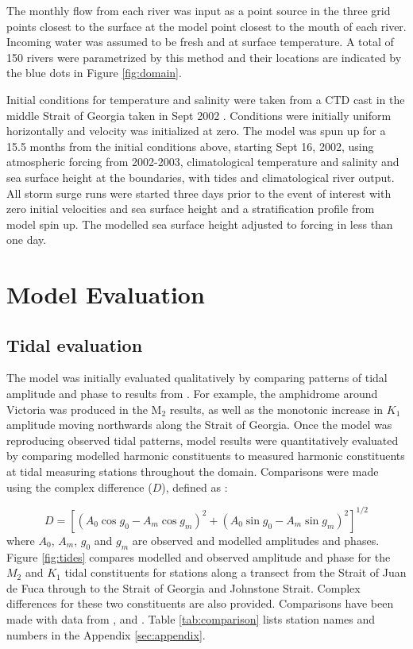 \documentclass[pdftex,10pt]{article}
\begin{document}
The monthly flow from each river was input as a point source in the three grid points closest to the surface at the model point closest to the mouth of each river. Incoming water was assumed to be fresh and at surface temperature. A total of 150 rivers were parametrized by this method and their locations are indicated by the blue dots in Figure \ref{fig:domain}.

Initial conditions for temperature and salinity were taken from a CTD cast in the middle Strait of Georgia taken in Sept 2002 \citep{pawlowiczetal2007}.  Conditions were initially uniform horizontally and velocity was initialized at zero. The model was spun up for a 15.5 months from the initial conditions above, starting Sept 16, 2002, using atmospheric forcing from 2002-2003, climatological temperature and salinity and sea surface height at the boundaries, with tides and climatological river output.  All storm surge runs were started three days prior to the event of interest with zero initial velocities and sea surface height and a stratification profile from model spin up. The modelled sea surface height adjusted to forcing in less than one day. 

\section{Model Evaluation}\label{sec:model}

\subsection{Tidal evaluation}
The model was initially evaluated qualitatively by comparing patterns of tidal amplitude and phase to results from \citet{foreman1995tidal}. For example, the amphidrome around Victoria was produced in the M$_2$ results, as well as the monotonic increase in $K_1$ amplitude moving northwards along the Strait of Georgia. Once the model was reproducing observed tidal patterns, model results were quantitatively evaluated by comparing modelled harmonic constituents to measured harmonic constituents at tidal measuring stations throughout the domain. Comparisons were made using the complex difference ($D$), defined as \citep{foreman1995tidal}:

\begin{equation}
D = [(A_0 \cos g_0 - A_m \cos g_m)^2 + (A_0 \sin g_0 - A_m \sin g_m)^2]^{1/2}
\end{equation}\label{eq:compdiff}
where $A_0$, $A_m$, $g_0$ and $g_m$ are observed and modelled amplitudes and phases. Figure \ref{fig:tides} compares modelled and observed amplitude and phase for the $M_2$ and $K_1$ tidal constituents for stations along a transect from the Strait of Juan de Fuca through to the Strait of Georgia and Johnstone Strait. Complex differences for these two constituents are also provided.  Comparisons have been made with data from \citet{foreman1995tidal}, \citet{foreman2004m} and \citet{foreman2012circulation}. Table  \ref{tab:comparison} lists station names and numbers in the Appendix \ref{sec:appendix}. 
\end{document}
